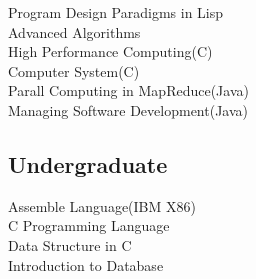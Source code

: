 \documentclass[a4paper]{lyu-resume} %
\begin{document}
\begin{minipage}[t]{0.33\textwidth}
Program Design Paradigms in Lisp \\
Advanced Algorithms \\
High Performance Computing(C)\\
Computer System(C) \\
Parall Computing in MapReduce(Java) \\
Managing Software Development(Java)

\sectionspace %
\subsection{Undergraduate}
Assemble Language(IBM X86) \\
C Programming Language \\
Data Structure in C \\
Introduction to Database

\sectionspace %
\end{minipage} %
\hfill
\end{document}
